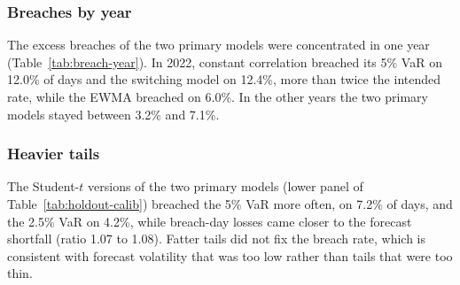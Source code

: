 \subsubsection{Breaches by year}

The excess breaches of the two primary models were concentrated in one year (Table~\ref{tab:breach-year}). In 2022, constant correlation breached its 5\% VaR on 12.0\% of days and the switching model on 12.4\%, more than twice the intended rate, while the EWMA breached on 6.0\%. In the other years the two primary models stayed between 3.2\% and 7.1\%.



\subsubsection{Heavier tails}

The Student-$t$ versions of the two primary models (lower panel of Table~\ref{tab:holdout-calib}) breached the 5\% VaR more often, on 7.2\% of days, and the 2.5\% VaR on 4.2\%, while breach-day losses came closer to the forecast shortfall (ratio 1.07 to 1.08). Fatter tails did not fix the breach rate, which is consistent with forecast volatility that was too low rather than tails that were too thin.
